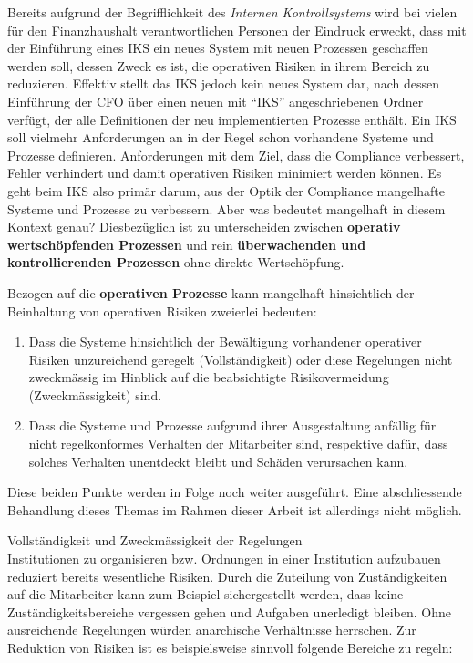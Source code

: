 \documentclass[10pt]{article}
\begin{document}
Bereits aufgrund der Begrifflichkeit des \textit{Internen Kontrollsystems} wird bei vielen für den Finanzhaushalt verantwortlichen Personen der Eindruck erweckt, dass mit der Einführung eines IKS ein neues System mit neuen Prozessen geschaffen werden soll, dessen Zweck es ist, die operativen Risiken in ihrem Bereich zu reduzieren. Effektiv stellt das IKS jedoch kein neues System dar, nach dessen Einführung der CFO über einen neuen mit “{}IKS”{} angeschriebenen Ordner verfügt, der alle Definitionen der neu implementierten Prozesse enthält. Ein IKS soll vielmehr Anforderungen an in der Regel schon vorhandene Systeme und Prozesse definieren. Anforderungen mit dem Ziel, dass die Compliance verbessert, Fehler verhindert und damit operativen Risiken minimiert werden können. Es geht beim IKS also primär darum, aus der Optik der Compliance mangelhafte Systeme und Prozesse zu verbessern. Aber was bedeutet mangelhaft in diesem Kontext genau? Diesbezüglich ist zu unterscheiden zwischen \textbf{operativ wertschöpfenden Prozessen} und rein \textbf{überwachenden und kontrollierenden Prozessen} ohne direkte Wertschöpfung.

Bezogen auf die \textbf{operativen Prozesse} kann mangelhaft hinsichtlich der Beinhaltung von operativen Risiken zweierlei bedeuten:

\begin{enumerate}
    \item Dass die Systeme hinsichtlich der Bewältigung vorhandener operativer Risiken unzureichend geregelt (Vollständigkeit) oder diese Regelungen nicht zweckmässig im Hinblick auf die beabsichtigte Risikovermeidung (Zweckmässigkeit) sind.

    \item Dass die Systeme und Prozesse aufgrund ihrer Ausgestaltung anfällig für nicht regelkonformes Verhalten der Mitarbeiter sind, respektive dafür, dass solches Verhalten unentdeckt bleibt und Schäden verursachen kann.

\end{enumerate}

Diese beiden Punkte werden in Folge noch weiter ausgeführt. Eine abschliessende Behandlung dieses Themas im Rahmen dieser Arbeit ist allerdings nicht möglich.

 Vollständigkeit und Zweckmässigkeit der Regelungen\\
Institutionen zu organisieren bzw. Ordnungen in einer Institution aufzubauen reduziert bereits wesentliche Risiken. Durch die Zuteilung von Zuständigkeiten auf die Mitarbeiter kann zum Beispiel sichergestellt werden, dass keine Zuständigkeitsbereiche vergessen gehen und Aufgaben unerledigt bleiben. Ohne ausreichende Regelungen würden anarchische Verhältnisse herrschen. Zur Reduktion von Risiken ist es beispielsweise sinnvoll folgende Bereiche zu regeln:
\end{document}
